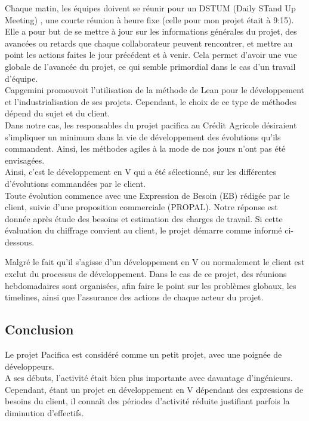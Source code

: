 \documentclass{rapport}
\begin{document}
Chaque matin, les équipes doivent se réunir pour un DSTUM (Daily STand Up Meeting) , une courte réunion à heure fixe (celle pour mon projet était à 9:15). Elle a pour but de se mettre à jour sur les informations générales du projet, des avancées ou retards que chaque collaborateur peuvent rencontrer, et mettre au point les actions faites le jour précédent et à venir. Cela permet d'avoir une vue globale de l'avancée du projet, ce qui semble primordial dans le cas d'un travail d'équipe.\\

Capgemini promouvoit l'utilisation de la méthode de Lean pour le développement et l'industrialisation de ses projets. Cependant, le choix de ce type de méthodes dépend du sujet et du client.\\ 
Dans notre cas, les responsables du projet pacifica au Crédit Agricole désiraient s'impliquer un minimum dans la vie de développement des évolutions qu'ils commandent. Ainsi, les méthodes agiles à la mode de nos jours n'ont pas été envisagées.\\

Ainsi, c'est le développement en V qui a été sélectionné, sur les différentes d'évolutions commandées par le client.\\


Toute évolution commence avec une Expression de Besoin (EB) rédigée par le client, suivie d'une proposition commerciale (PROPAL). Notre réponse est donnée après étude des besoins et estimation des charges de travail. Si cette évaluation du chiffrage convient au client, le projet démarre comme informé ci-dessous.


Malgré le fait qu'il s'agisse d'un développement en V ou normalement le client est exclut du processus de développement. Dans le cas de ce projet, des réunions hebdomadaires sont organisées, afin faire le point sur les problèmes globaux, les timelines, ainsi que l'assurance des actions de chaque acteur du projet.

\subsection{Conclusion}

Le projet Pacifica est considéré comme un petit projet, avec une poignée de développeurs.\\
A ses débuts, l'activité était bien plus importante avec davantage d'ingénieurs. Cependant, étant un projet en développement en V dépendant des expressions de besoins du client, il connaît des périodes d'activité réduite justifiant parfois la diminution d'effectifs.\\
\end{document}
